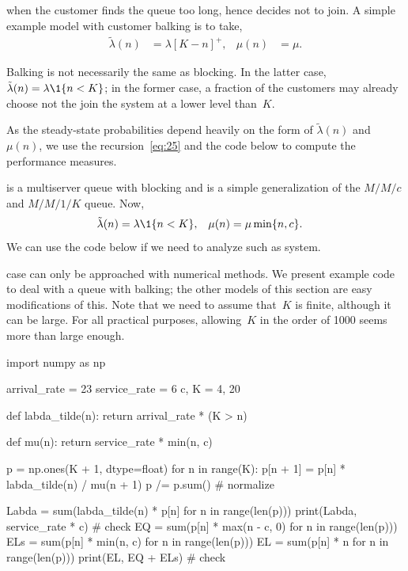 \documentclass[queueing-book.tex]{subfiles}
\begin{document}
 when the customer finds the queue too long, hence decides not to join.
A simple example model with customer balking is to take,
 \begin{align*}
\tilde \lambda(n) &= \lambda [K-n]^{+}, &  \mu(n)&=\mu.
\end{align*}

Balking is not necessarily the same as blocking.
In the latter case, $\tilde \lambda(n)= \lambda \1{n < K}$; in the former case, a fraction of the customers may already choose not the join the system at a lower level than~$K$.

As the steady-state probabilities depend heavily on the form of $\tilde \lambda(n)$ and $\mu(n)$, we use the recursion~\cref{eq:25} and the code below to compute the performance measures.



 is a multiserver queue with blocking and is a simple generalization of the $M/M/c$ and $M/M/1/K$ queue.
Now,
\begin{align*}
\tilde \lambda(n) &= \lambda\1{n<K}, &\mu(n) &= \mu \min\{n, c\}.
\end{align*}
We can use the code below if we need to analyze such as system.

 case can only be approached with numerical methods.
We present example code to deal with a queue with balking; the other models of this section are easy modifications of this.
Note that we need to assume that~$K$ is finite, although it can be large. For all practical purposes, allowing~$K$ in the order of 1000 seems more than large enough.

\begin{python}
import numpy as np

arrival_rate = 23
service_rate = 6
c, K = 4, 20


def labda_tilde(n):
    return arrival_rate * (K > n)


def mu(n):
    return service_rate * min(n, c)


p = np.ones(K + 1, dtype=float)
for n in range(K):
    p[n + 1] = p[n] * labda_tilde(n) / mu(n + 1)
p /= p.sum()  # normalize

Labda = sum(labda_tilde(n) * p[n] for n in range(len(p)))
print(Labda, service_rate * c) # check
EQ = sum(p[n] * max(n - c, 0) for n in range(len(p)))
ELs = sum(p[n] * min(n, c) for n in range(len(p)))
EL = sum(p[n] * n for n in range(len(p)))
print(EL, EQ + ELs) # check
\end{python}
\end{document}
